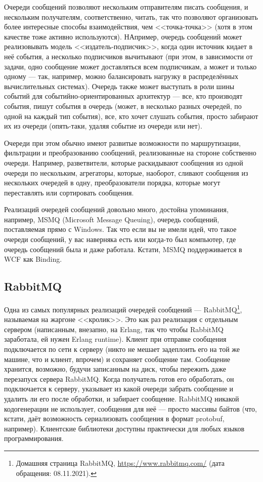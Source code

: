 \documentclass{../../text-style}
\begin{document}
Очереди сообщений позволяют нескольким отправителям писать сообщения, и нескольким получателям, соответственно, читать, так что позволяют организовать более интересные способы взаимодействия, чем <<точка-точка>> (хотя в этом качестве тоже активно используются). НАпример, очередь сообщений может реализовывать модель <<издатель-подписчик>>, когда один источник кидает в неё события, а несколько подписчиков вычитывают (при этом, в зависимости от задачи, одно сообщение может доставляться всем подписчикам, а может и только одному --- так, например, можно балансировать нагрузку в распределённых вычислительных системах). Очередь также может выступать в роли шины событий для событийно-ориентированных архитектур --- все, кто производят события, пишут события в очередь (может, в несколько разных очередей, по одной на каждый тип события), все, кто хочет слушать события, просто забирают их из очереди (опять-таки, удаляя событие из очереди или нет).

Очереди при этом обычно имеют развитые возможности по маршрутизации, фильтрации и преобразованию сообщений, реализованные на стороне собственно очереди. Например, разветвители, которые раскидывают сообщения из одной очереди по нескольким, агрегаторы, которые, наоборот, сливают сообщения из нескольких очередей в одну, преобразователи порядка, которые могут переставлять или сортировать сообщения.

Реализаций очередей сообщений довольно много, достойна упоминания, например, MSMQ (Microsoft Message Queuing), очередь сообщений, поставляемая прямо с Windows. Так что если вы не имели идей, что такое очереди сообщений, у вас наверняка есть или когда-то был компьютер, где очередь сообщений была и даже работала. Кстати, MSMQ поддерживается в WCF как Binding.

\subsection{RabbitMQ}

Одна из самых популярных реализаций очередей сообщений --- RabbitMQ\footnote{Домашняя страница RabbitMQ, \url{https://www.rabbitmq.com/} (дата обращения: 08.11.2021).}, называемая на жаргоне <<кролик>>. Это как раз реализация с отдельным сервером (написанным, внезапно, на Erlang, так что чтобы RabbitMQ заработала, ей нужен Erlang runtime). Клиент при отправке сообщения подключается по сети к серверу (никто не мешает задеплоить его на той же машине, что и клиент, впрочем) и сохраняет сообщение там. Сообщение хранится, возможно, будучи записанным на диск, чтобы пережить даже перезапуск сервера RabbitMQ. Когда получатель готов его обработать, он подключается к серверу, указывает из какой очереди забрать сообщение и удалить ли его после обработки, и забирает сообщение. RabbitMQ никакой кодогенерации не использует, сообщения для неё --- просто массивы байтов (что, кстати, даёт возможность сериализовать сообщения в формат protobuf, например). Клиентские библиотеки доступны практически для любых языков программирования.
\end{document}
